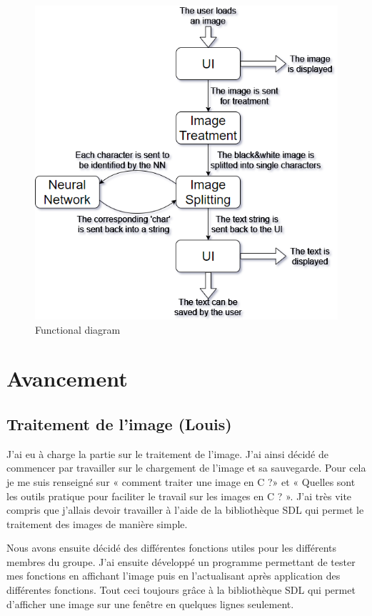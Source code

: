 \documentclass[12pt]{report}
\begin{document}
\begin{figure}[H]
    \centering
    \includegraphics[width=1\textwidth]{OCR_functionnal_diagram}
    \caption{Functional diagram}
\end{figure}

\chapter{Avancement}

\section{Traitement de l'image (Louis)}

J’ai eu à charge la partie sur le traitement de l’image. J’ai ainsi décidé de commencer par travailler sur le chargement de l’image et sa sauvegarde. Pour cela je me suis renseigné sur « comment traiter une image en C ?» et « Quelles sont les outils pratique pour faciliter le travail sur les images en C ? ». J’ai très vite compris que j’allais devoir travailler à l’aide de la bibliothèque SDL qui permet le traitement des images de manière simple.
 
Nous avons ensuite décidé des différentes fonctions utiles pour les différents membres du groupe.
J’ai ensuite développé un programme permettant de tester mes fonctions en affichant l’image puis en l’actualisant après application des différentes fonctions. Tout ceci toujours grâce à la bibliothèque SDL qui permet d’afficher une image sur une fenêtre en quelques lignes seulement.
\end{document}
